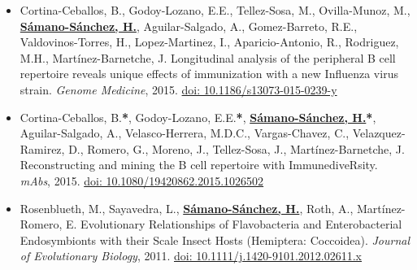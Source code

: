 \documentclass[11pt,a4paper,sans]{moderncv} %
\begin{document}
\begin{itemize}
  \item Cortina-Ceballos, B., Godoy-Lozano, E.E., Tellez-Sosa, M., Ovilla-Munoz, M., \textbf{\underline{S\'amano-S\'anchez, H.}}, Aguilar-Salgado, A., Gomez-Barreto, R.E., Valdovinos-Torres, H., Lopez-Martinez, I., Aparicio-Antonio, R., Rodriguez, M.H., Mart\'inez-Barnetche, J. Longitudinal analysis of the peripheral B cell repertoire reveals unique effects of immunization with a new Influenza virus strain. \textit{Genome Medicine}, 2015. \href{https://doi.org/10.1186/s13073-015-0239-y}{doi: 10.1186/s13073-015-0239-y}
  \item Cortina-Ceballos, B.\textbf{*}, Godoy-Lozano, E.E.\textbf{*}, \textbf{\underline{S\'amano-S\'anchez, H.}}\textbf{*}, Aguilar-Salgado, A., Velasco-Herrera, M.D.C., Vargas-Chavez, C., Velazquez-Ramirez, D., Romero, G., Moreno, J., Tellez-Sosa, J., Mart\'inez-Barnetche, J. Reconstructing and mining the B cell repertoire with ImmunediveRsity. \textit{mAbs}, 2015. \href{https://doi.org/10.1080/19420862.2015.1026502}{doi: 10.1080/19420862.2015.1026502}
  \item Rosenblueth, M., Sayavedra, L., \textbf{\underline{S\'amano-S\'anchez, H.}}, Roth, A., Mart\'inez-Romero, E. Evolutionary Relationships of Flavobacteria and Enterobacterial Endosymbionts with their Scale Insect Hosts (Hemiptera: Coccoidea). \textit{Journal of Evolutionary Biology}, 2011. \href{https://doi.org/10.1111/j.1420-9101.2012.02611.x}{doi: 10.1111/j.1420-9101.2012.02611.x}\\
\end{itemize}

\vspace{0.1cm}
\end{document}
